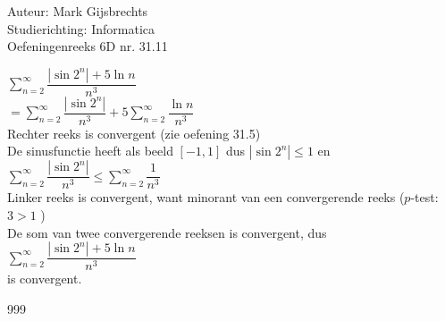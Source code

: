 \documentclass[a4paper]{article}
\begin{document}
\noindent \large Auteur: Mark Gijsbrechts \\
\noindent \large Studierichting: Informatica\\
\noindent \large Oefeningenreeks 6D nr. 31.11\\

\medskip

\normalsize



$ \displaystyle\sum\limits_{n=2}^\infty \dfrac{ \left| \sin 2^n \right| + 5 \ln n }{ n^3 } $ \\

$= \displaystyle\sum\limits_{n=2}^\infty \dfrac{ \left| \sin 2^n \right| }{n^3} + 5\displaystyle\sum_{n=2}^\infty \dfrac{ \ln n }{n^3} $ \\

Rechter reeks is convergent (zie oefening 31.5) \\

De sinusfunctie heeft als beeld $ \left[ -1, 1 \right] $ dus $ \left| \sin 2^n \right| \leq 1 $ en \\

$ \displaystyle\sum\limits_{n=2}^\infty \dfrac{ \left| \sin 2^n \right| }{n^3} \leq \displaystyle\sum\limits_{n=2}^\infty \dfrac{1}{n^3} $ \\

Linker reeks is convergent, want minorant van een convergerende reeks ($p$-test: $ 3 > 1 $ ) \\

De som van twee convergerende reeksen is convergent, dus \\

$ \displaystyle\sum\limits_{n=2}^\infty \dfrac{ \left| \sin 2^n \right| + 5 \ln n }{ n^3 } $ \\

is convergent. \\



\begin{thebibliography}{999}
\end{thebibliography}
\end{document}
